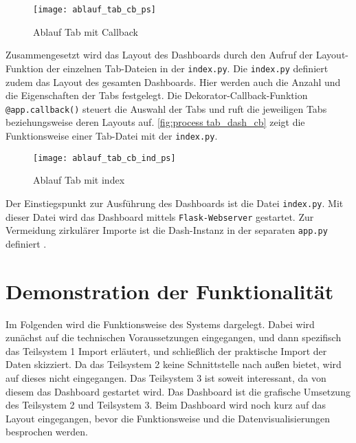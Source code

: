     \begin{figure}[H]
        \centering
            \texttt{[image: ablauf\_tab\_cb\_ps]}
            \caption{Ablauf Tab mit Callback}
            \label{fig:process tab_dash_cb}
    \end{figure}


    Zusammengesetzt wird das Layout des Dashboards durch den Aufruf der Layout-Funktion der einzelnen Tab-Dateien in der \texttt{index.py}.
    Die \texttt{index.py} definiert zudem das Layout des gesamten Dashboards. Hier werden auch die Anzahl und die Eigenschaften der Tabs festgelegt. 
    Die Dekorator-Callback-Funktion \texttt{@app.callback()} steuert die Auswahl der Tabs und ruft die jeweiligen Tabs beziehungsweise deren 
    Layouts auf. \autoref{fig:process tab_dash_cb} zeigt die Funktionsweise einer Tab-Datei mit der \texttt{index.py}.

    \begin{figure}[H]
        \centering
            \texttt{[image: ablauf\_tab\_cb\_ind\_ps]}
            \caption{Ablauf Tab mit index}
            \label{fig:process tab_dash_cb}
    \end{figure}

    Der Einstiegspunkt zur Ausführung des Dashboards ist die Datei \texttt{index.py}. Mit dieser Datei wird das Dashboard mittels \texttt{Flask-Webserver}
    gestartet. Zur Vermeidung zirkulärer Importe ist die Dash-Instanz in der separaten \texttt{app.py} definiert \cite[vgl.][]{plotly_url_2021}.



\section{Demonstration der Funktionalität}

    Im Folgenden wird die Funktionsweise des Systems dargelegt. 
    Dabei wird zunächst auf die technischen Voraussetzungen eingegangen, und dann spezifisch das Teilsystem 1 Import erläutert, und schließlich der
    praktische Import der Daten skizziert. Da das Teilsystem 2 keine Schnittstelle
    nach außen bietet, wird auf dieses nicht eingegangen. Das Teilsystem 3 ist soweit interessant, da von diesem das Dashboard
    gestartet wird. Das Dashboard ist die grafische Umsetzung des Teilsystem 2 und Teilsystem 3. Beim Dashboard wird noch kurz auf das Layout
    eingegangen, bevor die Funktionsweise und die Datenvisualisierungen besprochen werden.


